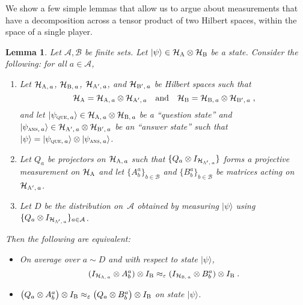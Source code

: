 \documentclass[11pt]{article}
\newtheorem{lemma}[theorem]{Lemma}
\theoremstyle{definition}
\newcommand{\ket}[1]{|#1\rangle}
\newcommand{\Id}{\ensuremath{I}}
\newcommand{\mH}{\ensuremath{\mathcal{H}}}
\newcommand{\eps}{\varepsilon}
\newcommand{\labelstyle}[1]{\ensuremath{\textsc{#1}}\xspace}
\newcommand{\alice}{\labelstyle{A}}
\newcommand{\bob}{\labelstyle{B}}
\renewcommand{\cal}[1]{\mathcal{#1}}
\begin{document}
We show a few simple lemmas that allow us to argue about measurements that
have a decomposition across a tensor product of two Hilbert spaces, within the
space of a single player.

\def\ha{\mH_{\alice}}
\def\hb{\mH_{\bob}}
\def\haq{\mH_{\alice,\, a}}
\def\haa{\mH_{\alice',\, a}}
\def\hbq{\mH_{\bob,\, a}}
\def\hba{\mH_{\bob',\, a}}
\def\sq{\ket{\psi_{\textsc{que},\, a}}}
\def\sa{\ket{\psi_{\textsc{ans},\, a}}}

\begin{lemma}
  \label{lem:conditional}
	Let $\cal{A}, \cal{B}$ be finite sets.
	Let $\ket{\psi} \in \ha \otimes \hb$ be a state.
  Consider the following: for all $a \in \cal{A}$,
  \begin{enumerate}
  \item Let $\haq$, $\hbq$, $\haa$, and $\hba$ be Hilbert spaces such that
    \begin{equation*}
  		\ha = \haq \otimes \haa\quad
      \text{and}\quad
      \hb = \hbq \otimes \hba\;,
		\end{equation*}
    and let $\sq \in \haq \otimes \hbq$ be a ``question state'' and $\sa \in
    \haa \otimes \hba$ be an ``answer state'' such that $\ket{\psi} = \sq
    \otimes \sa$.
  \item Let $Q_a$ be projectors on $\haq$ such that $\{Q_a \otimes
    \Id_{\haa}\}$ forms a projective measurement on $\ha$ and let
    $\{A^{a}_b\}_{b \in \cal{B}}$ and $\{B^{a}_b\}_{b \in \cal{B}}$ be matrices
    acting on $\haa$.
  \item Let $D$ be the distribution on~$\cal{A}$ obtained by measuring
    $\ket{\psi}$ using $\{ Q_a \otimes I_{\haa}\}_{a \in \cal{A}}$.
  \end{enumerate}
  Then the following are equivalent:
	\begin{itemize}
	\item On average over $a\sim D$ and with respect to state $\ket{\psi}$,
    \begin{equation*}
      (\Id_{\haq} \otimes A^{a}_b) \otimes \Id_\bob \approx_\eps
      (\Id_{\hbq} \otimes B^{a}_b) \otimes \Id_\bob\;.
    \end{equation*}
  \item $\bigl( Q_a \otimes A^{a}_b \bigr) \otimes \Id_{\bob} \approx_\eps
    \bigl( Q_a \otimes B^{a}_b \bigr) \otimes \Id_{\bob}$ on state $\ket{\psi}$.
	\end{itemize}
\end{lemma}
\end{document}
